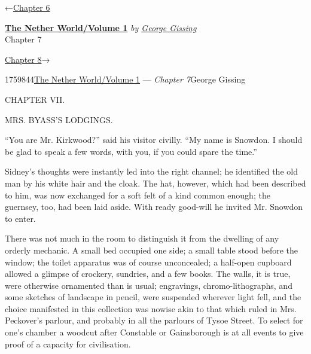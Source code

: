 \hypertarget{headerContainer}{}
\hypertarget{navigationHeader}{}
\protect\hypertarget{headerprevious}{}{←\href{/wiki/The_Nether_World/Volume_1/Chapter_6}{Chapter
6}}

\textbf{\protect\hypertarget{header_title_text}{}{\href{/w/index.php?title=The_Nether_World/Volume_1\&action=edit\&redlink=1}{The
Nether World/Volume 1}}} \emph{by
\href{/wiki/Author:George_Gissing}{\protect\hypertarget{header_author_text}{}{{George
Gissing}}}}\\
\protect\hypertarget{header_section_text}{}{Chapter 7}

\protect\hypertarget{headernext}{}{\href{/wiki/The_Nether_World/Volume_1/Chapter_8}{Chapter
8}→}

\hypertarget{navigationNotes}{}

\hypertarget{ws-data}{}
\protect\hypertarget{ws-article-id}{}{1759844}\protect\hypertarget{ws-title}{}{\href{/w/index.php?title=The_Nether_World/Volume_1\&action=edit\&redlink=1}{The
Nether World/Volume 1} --- \emph{Chapter
7}}\protect\hypertarget{ws-author}{}{George Gissing}

{\protect\hypertarget{143}{}{}}

{CHAPTER VII.}

MRS. BYASS'S LODGINGS.

``You are Mr. Kirkwood?'' said his visitor civilly. ``My name is
Snowdon. I should be glad to speak a few words, with you, if you could
spare the time.''

Sidney's thoughts were instantly led into the right channel; he
identified the old man by his white hair and the cloak. The hat,
however, which had been described to him, was now exchanged for a soft
felt of a kind common enough; the guernsey, too, had been laid aside.
With ready good-will he invited Mr. Snowdon to enter.

There was not much in the room to distinguish it from the dwelling of
any orderly mechanic. A small bed occupied one side; a small table stood
before the window; the toilet apparatus was of course unconcealed;
{\protect\hypertarget{144}{}{}}a half-open cupboard allowed a glimpse of
crockery, sundries, and a few books. The walls, it is true, were
otherwise ornamented than is usual; engravings, chromo-lithographs, and
some sketches of landscape in pencil, were suspended wherever light
fell, and the choice manifested in this collection was nowise akin to
that which ruled in Mrs. Peckover's parlour, and probably in all the
parlours of Tysoe Street. To select for one's chamber a woodcut after
Constable or Gainsborough is at all events to give proof of a capacity
for civilisation.

